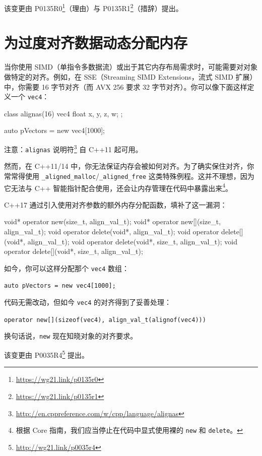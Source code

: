 \begin{myInfoBox}
该变更由 P0135R0\footnote{\url{https://wg21.link/p0135r0}}（理由）与 P0135R1\footnote{\url{https://wg21.link/p0135r1}}（措辞）提出。
\end{myInfoBox}

\section{为过度对齐数据动态分配内存}

当你使用 SIMD（单指令多数据流）或出于其它内存布局需求时，可能需要对对象做特定的对齐。例如，在 SSE（Streaming SIMD Extensions，流式 SIMD 扩展）中，你需要 16 字节对齐（而 AVX 256 要求 32 字节对齐）。你可以像下面这样定义一个 \texttt{vec4}：

\begin{codebox}[cpp]
class alignas(16) vec4
{
    float x, y, z, w;
};

auto pVectors = new vec4[1000];
\end{codebox}

注意：\texttt{alignas} 说明符\footnote{\url{http://en.cppreference.com/w/cpp/language/alignas}} 自 C++11 起可用。

然而，在 C++11/14 中，你无法保证内存会被如何对齐。为了确实保住对齐，你常常得使用 \texttt{\_aligned\_malloc}/\texttt{\_aligned\_free} 这类特殊例程。这并不理想，因为它无法与 C++ 智能指针配合使用，还会让内存管理在代码中暴露出来\footnote{根据 Core 指南，我们应当停止在代码中显式使用裸的 \texttt{new} 和 \texttt{delete}。}。

C++17 通过引入使用对齐参数的额外内存分配函数，填补了这一漏洞：

\begin{codebox}[cpp]
void* operator new(size_t, align_val_t);
void* operator new[](size_t, align_val_t);
void operator delete(void*, align_val_t);
void operator delete[](void*, align_val_t);
void operator delete(void*, size_t, align_val_t);
void operator delete[](void*, size_t, align_val_t);
\end{codebox}

如今，你可以这样分配那个 \texttt{vec4} 数组：

\texttt{auto pVectors = new vec4[1000];}

代码无需改动，但如今 \texttt{vec4} 的对齐得到了妥善处理：

\texttt{operator new[](sizeof(vec4), align\_val\_t(alignof(vec4)))}

换句话说，\texttt{new} 现在知晓对象的对齐要求。

\begin{myInfoBox}
该变更由 P0035R4\footnote{\url{http://wg21.link/p0035r4}} 提出。
\end{myInfoBox}

